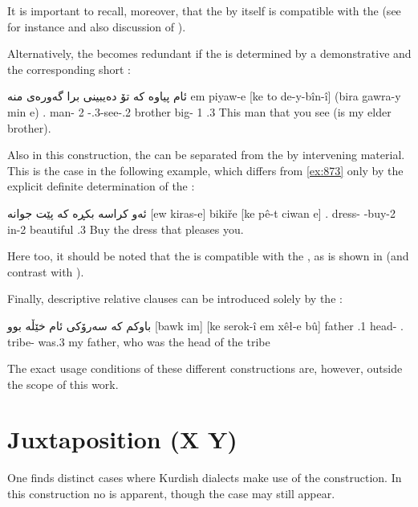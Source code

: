   
It is important to recall, moreover, that the   by itself is compatible with the \ez* (see for instance  and also discussion of \cite[27]{SamvelianEnclitique}).

Alternatively, the \ez* becomes redundant if the \prim is determined by a demonstrative and the corresponding short  :

{ئام پیاوە كە تۆ دەیبینی برا گەورەی منە}
{em piyaw-e [ke to de-y-bîn-î] (bira gawra-y min \cb{}e)}
{\dem.\near{} man- \rel{} 2\sg{} \ind-\patient.3\sg-see-\agent.2\sg{} brother big-\ez{} 1\sg{} \cb{}\cop.3\sg}
{This man that you see (is my elder brother).}
{\citep[156]{BlauSorani}}

Also in this construction, the \secn can be separated from the \prim by intervening material. This is the case in the following example, which differs from \ref{ex:873} only by the explicit definite determination of the \prim: 

{ئەو كراسە بكڕە كە پێت جوانە}
{[ew kiras-e] bikiře [ke pê-t ciwan \cb{}e]}
{\dem.\far{} dress- \subj-buy-2\sg{} \rel{} in-2\sg{} beautiful \cb{}\cop.3\sg}
{Buy the dress that pleases you.}
{\citep[157]{BlauSorani}}

Here too, it should be noted that the   is compatible with the \ez*, as is shown in   (and contrast with ).

Finally,  descriptive relative clauses can be introduced solely by the \rel*:

{باوكم كە سەرۆكی ئام  خێڵە بوو}
{[bawk \cb{}im] [ke serok-î em xêł-e bû] }
{father \cb{}\poss.1\sg{} \rel{} head-\ez{} \dem.\near{} tribe- was.3\sg}
{my father, who was the head of the tribe}
{\citep[156]{BlauSorani}}

The exact usage conditions of these different constructions are, however, outside the scope of this work.

\section{Juxtaposition (X Y)}\label{ss:Kur_Juxt}

One finds distinct cases where Kurdish dialects make use of the  construction. In this construction no \ez* is apparent, though the \obl* case may still appear. 

